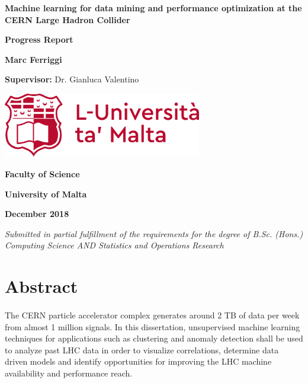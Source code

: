 \documentclass[12pt]{report}
\begin{document}
	\begin{titlepage}
		\centering
		{\LARGE\bfseries Machine learning for data mining and performance optimization at the CERN Large Hadron Collider \par}
		\vspace{.5cm}
		
		{\Large \textbf{Progress Report} \par}
		\vspace{.5cm}
		
		{\large \textbf{Marc Ferriggi}\par}
		\vspace{0.5cm}
		
		{\large \textbf{Supervisor:} Dr. Gianluca Valentino\par}
		\vfill
		
		\includegraphics[width=0.65\textwidth]{UoMLogo}\par
		\vfill
		
		{\large\bfseries Faculty of Science \par}
		{\large\bfseries University of Malta \par}
		{\large\bfseries December 2018 \par}
		
		\vspace{1cm}
		\textit{Submitted in partial fulfillment of the requirements for the degree of B.Sc. (Hons.) Computing Science AND Statistics and Operations Research}
	\end{titlepage}
	
	\tableofcontents
	\pagebreak
	
	\section{Abstract}
	\paragraph{ }The CERN particle accelerator complex generates around 2 TB of data per week from almost 1 million signals. In this dissertation, unsupervised machine learning techniques for applications such as clustering and anomaly detection shall be used to analyze past LHC data in order to visualize correlations, determine data driven models and identify opportunities for improving the LHC machine availability and performance reach.
	
\end{document}
